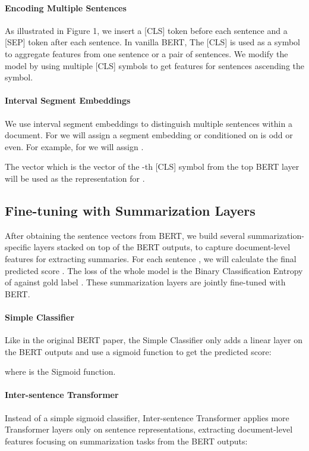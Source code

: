 \documentclass[11pt,a4paper]{article}
\begin{document}
    \paragraph{Encoding Multiple Sentences} As illustrated in Figure 1, we insert a [CLS] token before each sentence and a [SEP] token after each sentence.
    In vanilla BERT, The      [CLS] is used as a symbol to aggregate features from one sentence or a pair of sentences. We modify the model by using multiple [CLS] symbols to get features for  sentences ascending the symbol.
    
    \paragraph{Interval Segment Embeddings}
    We use interval segment embeddings to distinguish multiple sentences within a document. For  we will assign a segment embedding  or  conditioned on  is odd or even. For example, for   we will assign .
    
    The vector  which is the vector of the -th [CLS] symbol from the top BERT layer will be used as the representation for .
    
    
    \subsection{Fine-tuning with Summarization Layers}
    After obtaining the sentence vectors from BERT, we build several summarization-specific layers stacked on top of the BERT outputs, to capture document-level features for extracting summaries. 
    For each sentence , we will calculate the final predicted score .
        The loss of the whole model is the Binary Classification Entropy of  against gold label .
    These summarization layers  are jointly fine-tuned with BERT.

    
    \paragraph{Simple Classifier}
    Like in the original BERT paper, the Simple Classifier only adds a linear layer on the BERT outputs and use a sigmoid function to get the predicted score:
    
    where  is the Sigmoid function.
    

    
    
    \paragraph{Inter-sentence Transformer}
    Instead of a simple sigmoid classifier, Inter-sentence Transformer applies more Transformer layers only on sentence representations, extracting document-level features focusing on  summarization tasks from the BERT outputs:
    
\end{document}
